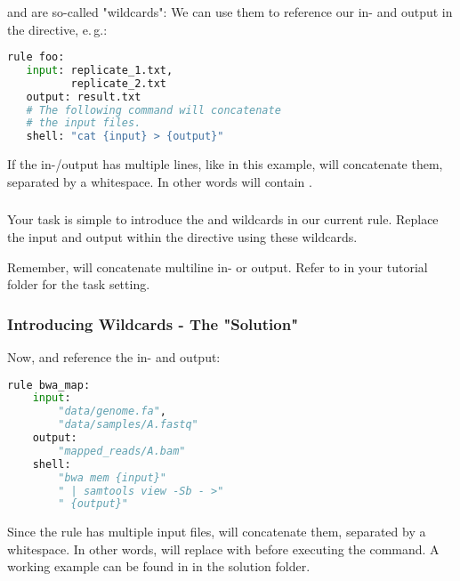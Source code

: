 \begin{frame}[fragile]
	\frametitle{}
	 and  are so-called "wildcards": We can use them 
	to reference our in- and output in the  directive, e.\,g.:
	\begin{lstlisting}[language=Python,style=Python]
rule foo:
   input: replicate_1.txt,
          replicate_2.txt
   output: result.txt
   # The following command will concatenate
   # the input files.
   shell: "cat {input} > {output}"
    \end{lstlisting}
    \begin{docs}
      If the in-/output has multiple lines, like in this example, \Snakemake{} will concatenate them, separated by a whitespace. In other words  will contain .
    \end{docs}
\end{frame}

\begin{frame}[fragile]
	\frametitle{}
	\begin{task}
	   Your task is simple to introduce the  and   wildcards in our current  rule. Replace the input and output within the  directive using these wildcards.
	\end{task}
    \begin{hint}
       Remember, \Snakemake{} will concatenate multiline in- or output. Refer to   in your tutorial folder for the task setting.
    \end{hint}
\end{frame}

\begin{frame}[fragile]
  \frametitle{Introducing Wildcards - The "Solution"}
  Now,  and  reference the in- and output:
  \begin{lstlisting}[language=Python,style=Python]
rule bwa_map:
    input:
        "data/genome.fa",
        "data/samples/A.fastq"
    output:
        "mapped_reads/A.bam"
    shell:
        "bwa mem {input}"
        " | samtools view -Sb - >"
        " {output}"
    \end{lstlisting}
    Since the rule has multiple input files, \Snakemake{} will concatenate them, separated by a whitespace. In other words, \Snakemake{} will replace  with  before executing the command.\newline
    A working example can be found in  in the solution folder.
\end{frame}

